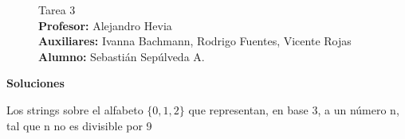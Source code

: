 \documentclass[letterpaper,10pt,table, dvipsnames]{article}
\begin{document}
\pagestyle{style2}
\begin{figure}
\centering
\begin{minipage}[c]{0.8\textwidth}
\centering
\vspace{0.3cm}
{\Large Tarea 3}
\vspace{0.3cm}\\
\textbf{Profesor:} Alejandro Hevia \\ \textbf{Auxiliares:} Ivanna Bachmann, Rodrigo Fuentes, Vicente Rojas\\
\textbf{Alumno:} Sebastián Sepúlveda A.
\end{minipage}
\end{figure}

\textbf{{\Large Soluciones}}
\\

\begin{tcolorbox}
 Los strings sobre el alfabeto $\{0,1,2\}$ que representan, en base 3, a un número n, tal que n no es divisible por 9
\end{tcolorbox}
\end{document}
